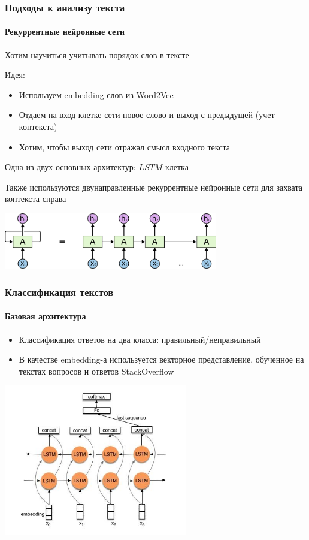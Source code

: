 \documentclass[10pt]{beamer}
\begin{document}

\begin{frame}
\frametitle{Подходы к анализу текста}
\framesubtitle{Рекуррентные нейронные сети}

Хотим научиться учитывать порядок слов в тексте
    	
Идея:
\begin{itemize}
	\item Используем embedding слов из Word2Vec
	\item Отдаем на вход клетке сети новое слово и выход с предыдущей (учет контекста)
	\item Хотим, чтобы выход сети отражал смысл входного текста
\end{itemize}

Одна из двух основных архитектур: $LSTM$-клетка

Также используются двунаправленные рекуррентные нейронные сети для захвата контекста справа

\begin{center}
\includegraphics[width=0.7\textwidth]{images/rnn.png}
\end{center}

\end{frame}


\begin{frame}
\frametitle{Классификация текстов}
\framesubtitle{Базовая архитектура}

\begin{itemize}
	\item Классификация ответов на два класса: правильный/неправильный
	\item В качестве embedding-а используется векторное представление, обученное на текстах вопросов и ответов StackOverflow
\end{itemize}

\begin{center}
\includegraphics[width=0.6\textwidth]{images/bilstm_text_classification.jpg}
\end{center}

\end{frame}
\end{document}
